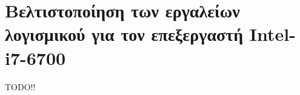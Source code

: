 \section{Βελτιστοποίηση των εργαλείων λογισμικού για τον επεξεργαστή Intel-i7-6700}
\label{sec:implementations_desktop}

TODO!!

